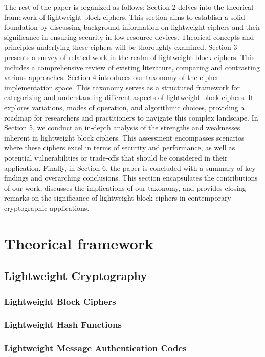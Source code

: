 \documentclass[conference,compsoc]{IEEEtran}
\begin{document}
The rest of the paper is organized as follows: Section 2 delves into the theorical framework of lightweight block ciphers. This section aims to establish a solid foundation by discussing background information on lightweight ciphers and their significance in ensuring security in low-resource devices. Theorical concepts and principles underlying these ciphers will be thoroughly examined. Section 3 presents a survey of related work in the realm of lightweight block ciphers. This includes a comprehensive review of existing literature, comparing and contrasting various approaches. Section 4 introduces our taxonomy of the cipher implementation space. This taxonomy serves as a structured framework for categorizing and understanding different aspects of lightweight block ciphers. It explores variations, modes of operation, and algorithmic choices, providing a roadmap for researchers and practitioners to navigate this complex landscape. In Section 5, we conduct an in-depth analysis of the strengths and weaknesses inherent in lightweight block ciphers. This assessment encompasses scenarios where these ciphers excel in terms of security and performance, as well as potential vulnerabilities or trade-offs that should be considered in their application. Finally, in Section 6, the paper is concluded with a summary of key findings and overarching conclusions. This section encapsulates the contributions of our work, discusses the implications of our taxonomy, and provides closing remarks on the significance of lightweight block ciphers in contemporary cryptographic applications.

\section{Theorical framework}
\subsection{Lightweight Cryptography}
\subsubsection{Lightweight Block Ciphers} 
\subsubsection{Lightweight Hash Functions} 
\subsubsection{Lightweight Message Authentication Codes} 
\end{document}

